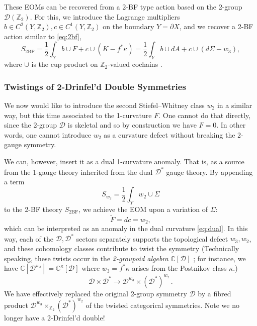 \documentclass[onecolumn]{article}
\theoremstyle{theorem}
\theoremstyle{remark}
\theoremstyle{example}
\theoremstyle{definition}
\numberwithin{equation}{section}
\def\bbZ{\mathbb{Z}}
\begin{document}
These EOMs can be recovered from a 2-BF type action based on the 2-group $\mathcal{D}(\bbZ_2)$. For this, we introduce  the Lagrange multipliers $b\in C^2(Y,\bbZ_2),c\in C^1(Y,\bbZ_2)$ on the boundary $Y=\partial X$, and we recover a 2-BF action similar to \eqref{eq:2bf},
\begin{equation}
    S_{\text{2BF}} = \frac{1}{2}\int_Y b\cup F + c\cup (K-f^*\kappa) = \frac{1}{2}\int_Y b\cup dA + c\cup (d\Sigma - w_3), \nonumber
\end{equation}
where $\cup$ is the cup product on $\bbZ_2$-valued cochains \cite{book-algtop}.


\subsubsection{Twistings of 2-Drinfel'd Double Symmetries}
We now would like to introduce the second Stiefel--Whitney class $w_2$ in a similar way, but this time associated to the 1-curvature $F$. One cannot do that directly, since the 2-group $\mathcal{D}$ is skeletal and so by construction we have $F=0$. In other words, one cannot introduce $w_2$ as a curvature defect without breaking the 2-gauge symmetry.

We can, however, insert it as a { {dual}} 1-curvature anomaly. That is, as a source from the 1-gauge  theory inherited from the dual $\mathcal{D}^*$ gauge theory.  By appending a term
\begin{equation}
    S_{w_2}=\frac{1}{2}\int_Y w_2 \cup \Sigma \nonumber
\end{equation}
to the 2-BF theory $S_\text{2BF}$, we achieve the EOM upon a variation of $\Sigma$:
\begin{equation}
    \tilde F = dc = w_2,\nonumber
\end{equation}
which can be interpreted as an anomaly in the dual curvature  \eqref{eq:dual}. In this way, each of the $\mathcal{D},\mathcal{D}^*$ sectors {{separately}} supports the topological defect $w_3,w_2$, and these cohomology classes contribute to twist the symmetry {(Technically speaking, these twists occur in the \textit{2-groupoid algebra} $\mathbb{C}[\mathcal{D}]$} \cite{Bullivant:2021}; {for instance, we have $\mathbb{C}[\mathcal{D}^{w_3}]=\mathbb{C}^{\kappa}[\mathcal{D}]$ where $w_3=f^*\kappa$ arises from the Postnikov class $\kappa$.})
$$\mathcal{D}\times\mathcal{D}^*\to\mathcal{D}^{w_3}\times(\mathcal{D}^*)^{w_2}\,.$$ 
{We} have effectively replaced the original 2-group symmetry $\mathcal{D}$ by a fibred product $\mathcal{D}^{w_3}\times_{\mathbb{Z}_2}(\mathcal{D}^*)^{w_2}$ of the twisted categorical symmetries. Note we no longer have a 2-Drinfel'd double!
\end{document}
